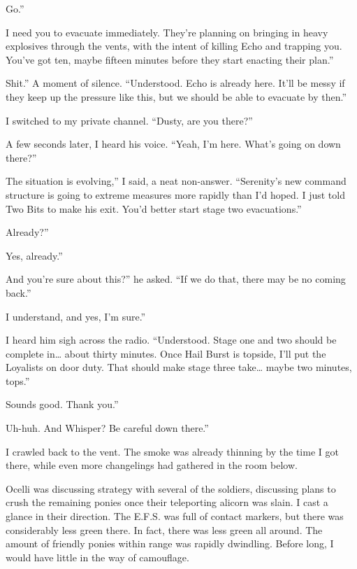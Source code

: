 \leavevmode{}Go.”

\leavevmode{}I need you to evacuate immediately. They’re planning on bringing in heavy explosives through the vents, with the intent of killing Echo and trapping you. You’ve got ten, maybe fifteen minutes before they start enacting their plan.”

\leavevmode{}Shit.” A moment of silence. “Understood. Echo is already here. It’ll be messy if they keep up the pressure like this, but we should be able to evacuate by then.”

I switched to my private channel. “Dusty, are you there?”

A few seconds later, I heard his voice. “Yeah, I’m here. What’s going on down there?”

\leavevmode{}The situation is evolving,” I said, a neat non-answer. “Serenity’s new command structure is going to extreme measures more rapidly than I’d hoped. I just told Two Bits to make his exit. You’d better start stage two evacuations.”

\leavevmode{}Already?”

\leavevmode{}Yes, already.”

\leavevmode{}And you’re sure about this?” he asked. “If we do that, there may be no coming back.”

\leavevmode{}I understand, and yes, I’m sure.”

I heard him sigh across the radio. “Understood. Stage one and two should be complete in… about thirty minutes. Once Hail Burst is topside, I’ll put the Loyalists on door duty. That should make stage three take… maybe two minutes, tops.”

\leavevmode{}Sounds good. Thank you.”

\leavevmode{}Uh-huh. And Whisper? Be careful down there.”

I crawled back to the vent. The smoke was already thinning by the time I got there, while even more changelings had gathered in the room below.

Ocelli was discussing strategy with several of the soldiers, discussing plans to crush the remaining ponies once their teleporting alicorn was slain. I cast a glance in their direction. The E.F.S. was full of contact markers, but there was considerably less green there. In fact, there was less green all around. The amount of friendly ponies within range was rapidly dwindling. Before long, I would have little in the way of camouflage.

